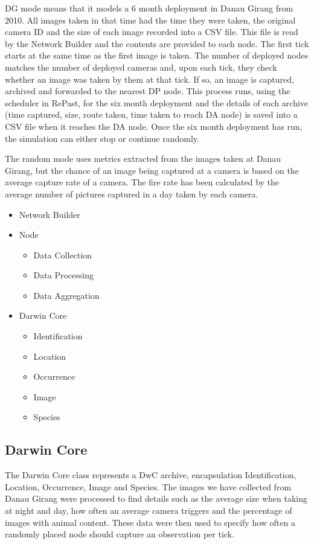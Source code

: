 DG mode means that it models a 6 month deployment in Danau Girang from 2010. All images taken in that time had the time they were taken, the original camera ID and the size of each image recorded into a CSV file. This file is read by the Network Builder and the contents are provided to each node. The first tick starts at the same time as the first image is taken. The number of deployed nodes matches the number of deployed cameras and, upon each tick, they check whether an image was taken by them at that tick. If so, an image is captured, archived and forwarded to the nearest DP node. This process runs, using the scheduler in RePast, for the six month deployment and the details of each archive (time captured, size, route taken, time taken to reach DA node) is saved into a CSV file when it reaches the DA node. Once the six month deployment has run, the simulation can either stop or continue randomly.

The random mode uses metrics extracted from the images taken at Danau Girang, but the chance of an image being captured at a camera is based on the average capture rate of a camera. The fire rate has been calculated by the average number of pictures captured in a day taken by each camera. 

\begin{itemize}
\item Network Builder
\item Node
	\begin{itemize}
	\item Data Collection
	\item Data Processing
	\item Data Aggregation
	\end{itemize}
\item Darwin Core
	\begin{itemize}
	\item Identification
	\item Location
	\item Occurrence
	\item Image
	\item Species
	\end{itemize}	 
\end{itemize}

\subsection{Darwin Core}
The Darwin Core class represents a DwC archive, encapsulation Identification, Location, Occurrence, Image and Species. The images we have collected from Danau Girang were processed to find details such as the average size when taking at night and day, how often an average camera triggers and the percentage of images with animal content. These data were then used to specify how often a randomly placed node should capture an observation per tick.

